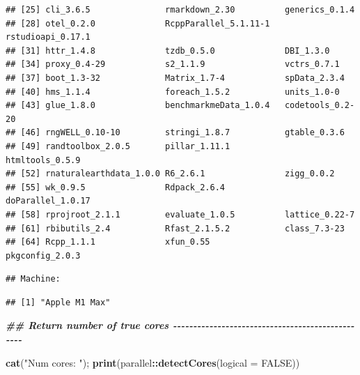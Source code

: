 \documentclass[
  11pt,
]{article}
\newenvironment{Shaded}{\begin{snugshade}}{\end{snugshade}}
\newcommand{\AttributeTok}[1]{\textcolor[rgb]{0.13,0.29,0.53}{#1}}
\newcommand{\ConstantTok}[1]{\textcolor[rgb]{0.56,0.35,0.01}{#1}}
\newcommand{\DocumentationTok}[1]{\textcolor[rgb]{0.56,0.35,0.01}{\textbf{\textit{#1}}}}
\newcommand{\FunctionTok}[1]{\textcolor[rgb]{0.13,0.29,0.53}{\textbf{#1}}}
\newcommand{\NormalTok}[1]{#1}
\newcommand{\SpecialCharTok}[1]{\textcolor[rgb]{0.81,0.36,0.00}{\textbf{#1}}}
\newcommand{\StringTok}[1]{\textcolor[rgb]{0.31,0.60,0.02}{#1}}
\begin{document}
\begin{verbatim}
## [25] cli_3.6.5               rmarkdown_2.30          generics_0.1.4         
## [28] otel_0.2.0              RcppParallel_5.1.11-1   rstudioapi_0.17.1      
## [31] httr_1.4.8              tzdb_0.5.0              DBI_1.3.0              
## [34] proxy_0.4-29            s2_1.1.9                vctrs_0.7.1            
## [37] boot_1.3-32             Matrix_1.7-4            spData_2.3.4           
## [40] hms_1.1.4               foreach_1.5.2           units_1.0-0            
## [43] glue_1.8.0              benchmarkmeData_1.0.4   codetools_0.2-20       
## [46] rngWELL_0.10-10         stringi_1.8.7           gtable_0.3.6           
## [49] randtoolbox_2.0.5       pillar_1.11.1           htmltools_0.5.9        
## [52] rnaturalearthdata_1.0.0 R6_2.6.1                zigg_0.0.2             
## [55] wk_0.9.5                Rdpack_2.6.4            doParallel_1.0.17      
## [58] rprojroot_2.1.1         evaluate_1.0.5          lattice_0.22-7         
## [61] rbibutils_2.4           Rfast_2.1.5.2           class_7.3-23           
## [64] Rcpp_1.1.1              xfun_0.55               pkgconfig_2.0.3
\end{verbatim}

\begin{Shaded}
\end{Shaded}

\begin{verbatim}
## Machine:
\end{verbatim}

\begin{verbatim}
## [1] "Apple M1 Max"
\end{verbatim}

\begin{Shaded}
\begin{Highlighting}[]
\DocumentationTok{\#\# Return number of true cores {-}{-}{-}{-}{-}{-}{-}{-}{-}{-}{-}{-}{-}{-}{-}{-}{-}{-}{-}{-}{-}{-}{-}{-}{-}{-}{-}{-}{-}{-}{-}{-}{-}{-}{-}{-}{-}{-}{-}{-}{-}{-}{-}{-}{-}{-}{-}{-}{-}}

\FunctionTok{cat}\NormalTok{(}\StringTok{"Num cores:   "}\NormalTok{); }\FunctionTok{print}\NormalTok{(parallel}\SpecialCharTok{::}\FunctionTok{detectCores}\NormalTok{(}\AttributeTok{logical =} \ConstantTok{FALSE}\NormalTok{))}
\end{Highlighting}
\end{Shaded}
\end{document}
